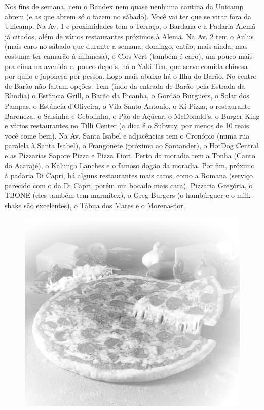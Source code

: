 Nos fins de semana, nem o Bandex nem quase nenhuma cantina da Unicamp abrem (e
as que abrem só o fazem no sábado). Você vai ter que se virar fora da Unicamp.
Na Av. 1 e proximidades tem o Terraço, o Bardana e a Padaria Alemã já citados, além de
vários restaurantes próximos à Alemã. Na Av. 2 tem o Aulus (mais caro no sábado
que durante a semana; domingo, então, mais ainda, mas costuma ter camarão
à milanesa), o Clos Vert (também é caro), um pouco mais pra cima na avenida e,
pouco depois, há o Yaki-Ten, que serve comida chinesa por quilo e japonesa por
pessoa. Logo mais abaixo há o Ilha do Barão. No centro de Barão não faltam
opções. Tem (indo da entrada de Barão pela Estrada da Rhodia) o Estância Grill,
o Barão da Picanha, o Gordão Burguers, o Solar dos Pampas, o Estância d'Oliveira,
o Vila Santo Antonio, o Ki-Pizza, o restaurante Baroneza, o Salsinha
e Cebolinha, o Pão de Açúcar, o McDonald's, o Burger King e vários restaurantes no Tilli Center (a dica
é o Subway, por menos de 10 reais você come bem). Na Av. Santa Isabel
e adjacências tem o Cronópio (numa rua paralela à Santa Isabel), o Frangonete
(próximo ao Santander), o HotDog Central e as Pizzarias Sapore Pizza e Pizza
Fiori. Perto da moradia tem a Tonha (Canto do Acarajé), o Kalunga Lanches
e o famoso dogão da moradia. Por fim, próximo à padaria Di Capri, há alguns
restaurantes mais caros, como a Romana (serviço parecido com o da Di Capri,
porém um bocado mais cara), Pizzaria Gregória, o TBONE (eles também tem
marmitex), o Greg Burgers (o hambúrguer e o milk-shake são excelentes), o Tábua
dos Mares e o Morena-flor.
\begin{figure}[h!]
    \centering
    \includegraphics[scale=0.28,keepaspectratio=true]{img/imgs/6-comida/-045.jpg}
\end{figure}


